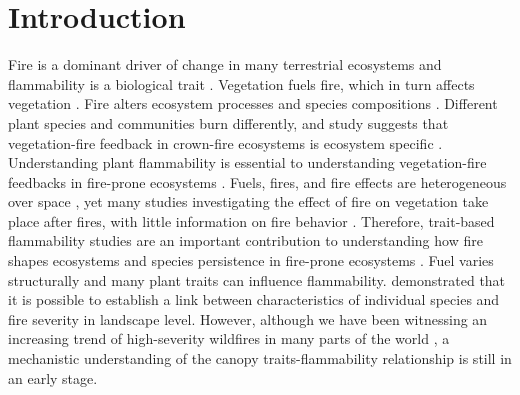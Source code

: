 \documentclass[12pt]{report}
\begin{document}
\section{Introduction}

Fire is a dominant driver of change in many terrestrial ecosystems and flammability is a biological trait \citep{pausas2012flammability}. Vegetation fuels fire, which in turn affects vegetation \citep{bova2005linking, jones2006prediction, kavanagh2010way,o2010acute, michaletz2012moving, west2016experimental, lodge2018xylem, bar2019fire}. Fire alters ecosystem processes \citep{debano1978effect, debano1998fire, grogan2000fire,wan2001fire, keane2008ecological, roces2022global,ojima1994long} and species compositions \citep{cochrane2003fire,cleary2004changes, laurance2003slow}. Different plant species and communities burn differently, and study suggests that vegetation-fire feedback in crown-fire ecosystems is ecosystem specific \citep{pausas2004plant}. 
Understanding plant flammability is essential to understanding vegetation-fire feedbacks in fire-prone ecosystems \citep{pausas2012fire, pausas2017flammability}. Fuels, fires, and fire effects are heterogeneous over space \citep{gagnon2010does}, yet many studies investigating the effect of fire on vegetation take place after fires, with little information on fire behavior \citep{o2018advances}. Therefore, trait-based flammability studies are an important contribution to understanding how fire shapes ecosystems and species persistence in fire-prone ecosystems \citep{pausas2012fire, pausas2017flammability}. Fuel varies structurally and many plant traits can influence flammability. \citet{schwilk2011scaling} demonstrated that it is possible to establish a link between characteristics of individual species  and fire severity in landscape level. However, although we have been witnessing an increasing trend of high-severity wildfires in many parts of the world \citep{miller2012trends, dennison2014large, weber2020spatiotemporal, salguero2020wildfire}, a mechanistic understanding of the canopy traits-flammability relationship is still in an early stage.
\end{document}

